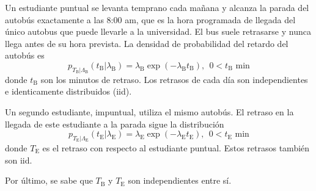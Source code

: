 \ifspanish

\question[30] %

Un estudiante puntual se levanta temprano cada mañana y alcanza la parada del autobús exactamente a las 8:00 am, que es la hora programada de llegada del único autobus que puede llevarle a la universidad. El bus suele retrasarse y nunca llega antes de su hora prevista. La densidad de probabilidad del retardo del autobús es 
$$
p_{T_\text{B}|\Lambda_\text{B}}(t_\text{B}|\lambda_\text{B}) = \lambda_\text{B} \exp(-\lambda_\text{B} t_\text{B}),~~0<t_\text{B}\text{ min}
$$
donde $t_\text{B}$ son los minutos de retraso. Los retrasos de cada día son independientes e identicamente distribuidos (iid).

Un segundo estudiante, impuntual, utiliza el mismo autobús. El retraso en la llegada de este estudiante a la parada sigue la distribución
$$
p_{T_\text{E}|\Lambda_\text{E}}(t_\text{E}|\lambda_\text{E}) = \lambda_\text{E} \exp(-\lambda_\text{E} t_\text{E}),~~0<t_\text{E}\text{ min}
$$
donde $T_\text{E}$ es el retraso con respecto al estudiante puntual. Estos retrasos también son iid.

Por último, se sabe que $T_\text{B}$ y $T_\text{E}$ son independientes entre sí.


